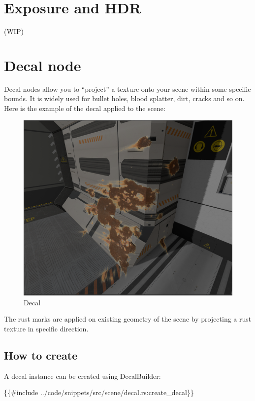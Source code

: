 \documentclass[
]{book}
\newenvironment{Shaded}{\begin{snugshade}}{\end{snugshade}}
\newcommand{\NormalTok}[1]{#1}
\theoremstyle{definition}
\theoremstyle{definition}
\theoremstyle{definition}
\theoremstyle{definition}
\theoremstyle{remark}
\begin{document}
\section{Exposure and HDR}\label{exposure-and-hdr}

(WIP)

\section{Decal node}\label{decal-node}

Decal nodes allow you to ``project'' a texture onto your scene within some specific bounds. It is widely used for bullet holes, blood splatter, dirt, cracks and so on. Here is the example of the decal applied to the scene:

\begin{figure}
\centering
\includegraphics{images/scene_decal.PNG}
\caption{Decal}
\end{figure}

The rust marks are applied on existing geometry of the scene by projecting a rust texture in specific direction.

\subsection{How to create}\label{how-to-create-7}

A decal instance can be created using DecalBuilder:

\begin{Shaded}
\begin{Highlighting}[]
\NormalTok{\{\{\#include ../code/snippets/src/scene/decal.rs:create\_decal\}\}}
\end{Highlighting}
\end{Shaded}
\end{document}
